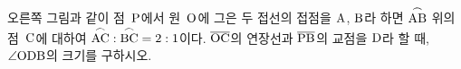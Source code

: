 \noindent\begin{minipage}[t]{0.58\linewidth}\vspace{0pt}\raggedright 오른쪽 그림과 같이 점~$\mathrm{P}$에서 원~$\mathrm{O}$에 그은 두 접선의 접점을 $\mathrm{A}$, $\mathrm{B}$라 하면 $\overset{\frown}{\mathrm{AB}}$ 위의 점~$\mathrm{C}$에 대하여 $\overset{\frown}{\mathrm{AC}}:\overset{\frown}{\mathrm{BC}}=2:1$이다. $\overline{\mathrm{OC}}$의 연장선과 $\overline{\mathrm{PB}}$의 교점을 $\mathrm{D}$라 할 때, $\angle\mathrm{ODB}$의 크기를 구하시오.\end{minipage}\hfill\begin{minipage}[t]{0.4\linewidth}\vspace{0pt}\centering \resizebox{\ifdim\width>\linewidth\linewidth\else\width\fi}{!}{}\end{minipage}\par
